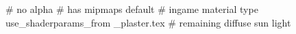 # no alpha
# has mipmaps
default			 # ingame material type
use_shaderparams_from
_plaster.tex		 # remaining diffuse sun light





